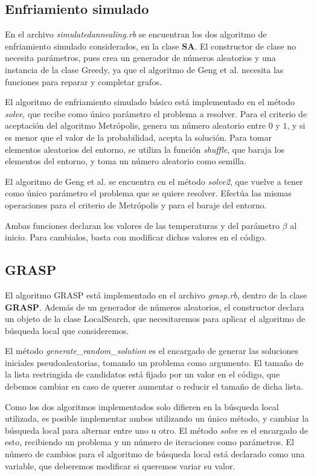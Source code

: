 \subsection{Enfriamiento simulado}

En el archivo \textit{simulatedannealing.rb} se encuentran los dos algoritmo de
enfriamiento simulado considerados, en la clase \textbf{SA}. El constructor de
clase no necesita parámetros, pues crea un generador de números aleatorios y
una instancia de la clase Greedy, ya que el algoritmo de Geng et al. necesita
las funciones para reparar y completar grafos.

El algoritmo de enfriamiento simulado básico está implementado en el método
\textit{solve}, que recibe como único parámetro el problema a resolver. Para el
criterio de aceptación del algoritmo Metrópolis, genera un número aleatorio entre
$0$ y $1$, y si es menor que el valor de la probabilidad, acepta la solución.
Para tomar elementos aleatorios del entorno, se utiliza la función \textit{shuffle},
que baraja los elementos del entorno, y toma un número aleatorio como semilla.

El algoritmo de Geng et al. se encuentra en el método \textit{solve2}, que vuelve
a tener como único parámetro el problema que se quiere resolver. Efectúa las mismas
operaciones para el criterio de Metrópolis y para el baraje del entorno.

Ambas funciones declaran los valores de las temperaturas y del parámetro $\beta$
al inicio. Para cambialos, basta con modificar dichos valores en el código.

\subsection{GRASP}

El algoritmo GRASP está implementado en el archivo \textit{grasp.rb}, dentro de la
clase \textbf{GRASP}. Además de un generador de números aleatorios, el constructor
declara un objeto de la clase LocalSearch, que necesitaremos para aplicar el
algoritmo de búsqueda local que consideremos.

El método \textit{generate\_random\_solution} es el encargado de generar las soluciones
iniciales pseudoaleatorias, tomando un problema como argumento. El tamaño de la
lista restringida de candidatos está fijado por un valor en el código, que debemos
cambiar en caso de querer aumentar o reducir el tamaño de dicha lista.

Como los dos algoritmos implementados solo difieren en la búsqueda local utilizada,
es posible implementar ambos utilizando un único método, y cambiar la búsqueda local
para alternar entre uno u otro. El método \textit{solve} es el encargado de esto,
recibiendo un problema y un número de iteraciones como parámetros. El número de
cambios para el algoritmo de búsqueda local está declarado como una variable, que
deberemos modificar si queremos variar su valor.

